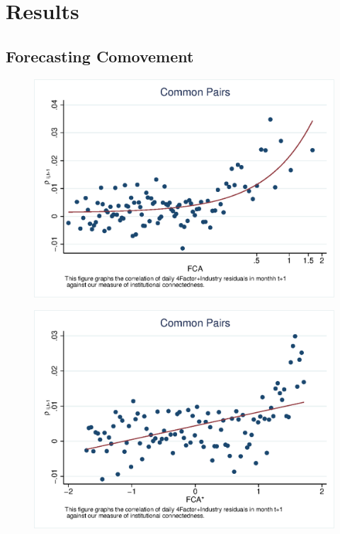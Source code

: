 \documentclass[12pt, a4paper]{article}
\begin{document}
\section{Results}

\subsection{Forecasting Comovement}



 \begin{figure}
 \centering  
\includegraphics[width=0.85\linewidth]{"mcorr50.eps"}
\end{figure}

 \begin{figure}
 \centering  
\includegraphics[width=0.85\linewidth]{"mcorr5l.eps"}
\end{figure}




        
\end{document}
